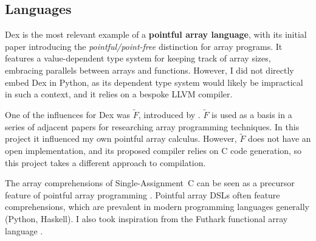 \subsection{Languages}

Dex is the most relevant example of a \textbf{pointful array language}, with its initial paper \cite{paszke2021getting} introducing the \textit{pointful/point-free} distinction for array programs. 
It features a value-dependent type system for keeping track of array sizes, embracing parallels between arrays and functions. 
However, I did not directly embed Dex in Python, as its dependent type system would likely be impractical in such a context, and it relies on a bespoke LLVM compiler.

One of the influences for Dex was $\tilde F$, introduced by \textcite{shaikhha2019efficient}. 
$\tilde F$ is used as a basis in a series of adjacent papers for researching array programming techniques.
In this project it influenced my own pointful array calculus.
However, $\tilde F$ does not have an open implementation, and its proposed compiler relies on C code generation, so this project takes a different approach to compilation. 

The array comprehensions of Single-Assignment~C can be seen as a precursor feature of pointful array programming \cite{scholz1994single}. Pointful array DSLs often feature comprehensions, which are prevalent in modern programming languages generally (Python, Haskell). I also took inspiration from the Futhark functional array language \cite{henriksen2017futhark}. 



